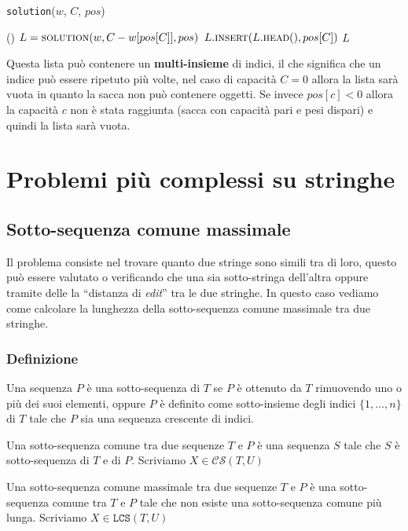                 \begin{algorithm}[H]
                    \caption{\List \texttt{solution}(\Int[] $w$, \Int $C$, \Int[] $pos$)}
                    \begin{algorithmic}
                            \State \Return \List()
                        \EndIf
                        \State \List $L = \Call{solution}{w, C-w[pos[C]], pos}$
                        \State $L.\Call{insert}{L.\textsc{head}(), pos[C]}$
                        \State \Return $L$
                    \end{algorithmic}
                \end{algorithm}
                Questa lista può contenere un \textbf{multi-insieme} di indici, il che significa che un indice può essere ripetuto più volte, nel caso di capacità $C=0$ allora la lista sarà vuota in quanto la sacca non può contenere oggetti.
                Se invece $pos[c]<0$ allora la capacità $c$ non è stata raggiunta (sacca con capacità pari e pesi dispari) e quindi la lista sarà vuota.
\section{Problemi più complessi su stringhe}
    \subsection{Sotto-sequenza comune massimale}
        Il problema consiste nel trovare quanto due stringe sono simili tra di loro, questo può essere valutato o verificando che una sia sotto-stringa dell'altra oppure tramite delle la ``distanza di \textit{edit}'' tra le due stringhe. In questo caso vediamo come calcolare la lunghezza della sotto-sequenza comune massimale tra due stringhe.
        \subsubsection{Definizione}
            Una sequenza $P$ è una sotto-sequenza di $T$ se $P$ è ottenuto da $T$ rimuovendo uno o più dei suoi elementi, oppure $P$ è definito come sotto-insieme degli indici $\{1,\dots,n\}$ di $T$ tale che $P$ sia una sequenza crescente di indici.
            \begin{definition}
                Una sotto-sequenza comune tra due sequenze $T$ e $P$ è una sequenza $S$ tale che $S$ è sotto-sequenza di $T$ e di $P$. Scriviamo $X \in\mathcal{CS}(T,U)$
            \end{definition}
            \begin{definition}
                Una sotto-sequenza comune massimale tra due sequenze $T$ e $P$ è una sotto-sequenza comune tra $T$ e $P$ tale che non esiste una sotto-sequenza comune più lunga. Scriviamo $X \in\mathcal{\texttt{LCS}}(T,U)$
            \end{definition}
